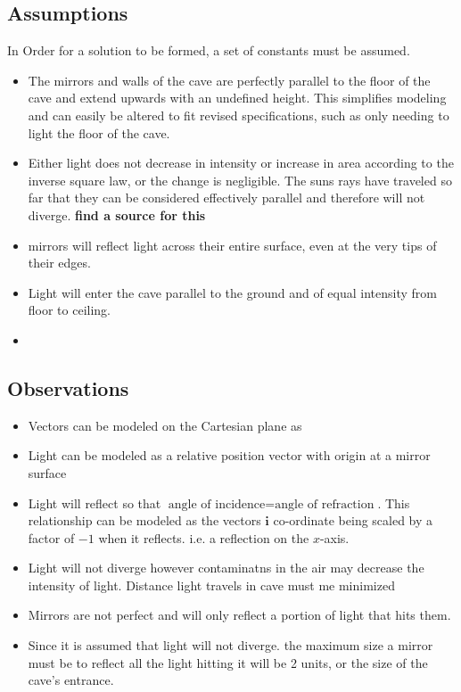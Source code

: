 \documentclass[11pt, letterpaper]{article}
\begin{document}
\subsection{Assumptions} 
\par
In Order for a solution to be formed, a set of constants must be assumed.
\begin{itemize}
	\item The mirrors and walls of the cave are perfectly parallel to the floor of the cave and extend upwards with an undefined height. This simplifies modeling and can easily be altered to fit revised specifications, such as only needing to light the floor of the cave.
	
	\item Either light does not decrease in intensity or increase in area according to the inverse square law, or the change is negligible. The suns rays have traveled so far that they can be considered effectively parallel and therefore will not diverge. 
	\textbf{find a source for this}
		
	\item mirrors will reflect light across their entire surface, even at the very tips of their edges. 
		
	\item Light will enter the cave parallel to the ground and of equal intensity from floor to ceiling.
	
	\item 
\end{itemize}

\subsection{Observations}
\par
\begin{itemize}
\item Vectors can be modeled on the Cartesian plane as 

\item Light can be modeled as a relative position vector with origin at a mirror surface

\item Light will reflect so that $\textrm{angle  of incidence} = \textrm{angle of refraction}$. This relationship can be modeled as the vectors $\bm{i}$ co-ordinate being scaled by a factor of $-1$ when it reflects. i.e. a reflection on the $x$-axis.

\item Light will not diverge however contaminatns in the air may decrease the intensity of light. Distance light travels in cave must me minimized

\item Mirrors are not perfect and will only reflect a portion of light that hits them. 

\item  Since it is assumed that light will not diverge. the maximum size a mirror must be to reflect all the light hitting it will be 2 units, or the size of the cave's entrance.


\end{itemize}
\end{document}
